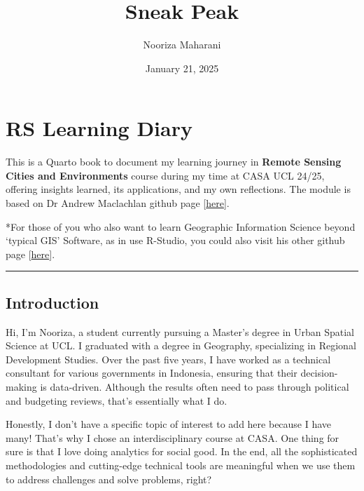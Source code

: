 \documentclass[
  letterpaper,
  DIV=11,
  numbers=noendperiod]{scrreprt}
\title{Sneak Peak}
\author{Nooriza Maharani}
\date{January 21, 2025}
\renewcommand*\contentsname{Table of contents}
\newcommand\contentsname{Table of contents}
\begin{document}
\maketitle
\ifdefined\Shaded\renewenvironment{Shaded}{\begin{tcolorbox}[sharp corners, breakable, borderline west={3pt}{0pt}{shadecolor}, frame hidden, interior hidden, boxrule=0pt, enhanced]}{\end{tcolorbox}}\fi

\renewcommand*\contentsname{Table of contents}
{
\hypersetup{linkcolor=}
\setcounter{tocdepth}{2}
\tableofcontents
}

\hypertarget{rs-learning-diary}{%
\chapter{RS Learning Diary}\label{rs-learning-diary}}

This is a Quarto book to document my learning journey in \textbf{Remote
Sensing Cities and Environments} course during my time at CASA UCL
24/25, offering insights learned, its applications, and my own
reflections. The module is based on Dr Andrew Maclachlan github page
{[}\href{https://andrewmaclachlan.github.io/CASA0023/.}{here}{]}.

*For those of you who also want to learn Geographic Information Science
beyond `typical GIS' Software, as in use R-Studio, you could also visit
his other github page
{[}\href{https://andrewmaclachlan.github.io/CASA0005repo/index.html}{here}{]}.

\begin{center}\rule{0.5\linewidth}{0.5pt}\end{center}

\hypertarget{introduction}{%
\section{Introduction}\label{introduction}}

Hi, I'm Nooriza, a student currently pursuing a Master's degree in Urban
Spatial Science at UCL. I graduated with a degree in Geography,
specializing in Regional Development Studies. Over the past five years,
I have worked as a technical consultant for various governments in
Indonesia, ensuring that their decision-making is data-driven. Although
the results often need to pass through political and budgeting reviews,
that's essentially what I do.

Honestly, I don't have a specific topic of interest to add here because
I have many! That's why I chose an interdisciplinary course at CASA. One
thing for sure is that I love doing analytics for social good. In the
end, all the sophisticated methodologies and cutting-edge technical
tools are meaningful when we use them to address challenges and solve
problems, right?
\end{document}
